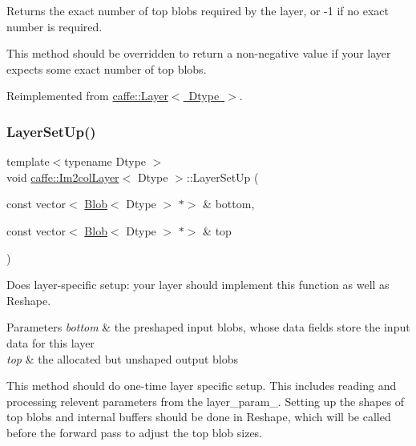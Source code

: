 Returns the exact number of top blobs required by the layer, or -\/1 if no exact number is required. 

This method should be overridden to return a non-\/negative value if your layer expects some exact number of top blobs. 

Reimplemented from \mbox{\hyperlink{classcaffe_1_1_layer_a64e2ca72c719e4b2f1f9216ccfb0d37f}{caffe\+::\+Layer$<$ Dtype $>$}}.

\mbox{\label{classcaffe_1_1_im2col_layer_ac4d6f34378681fa197546468b5aa6fd6}} 
\subsubsection{\texorpdfstring{Layer\+Set\+Up()}{LayerSetUp()}\hspace{0.1cm}{\footnotesize\ttfamily [1/2]}}
{\footnotesize\ttfamily template$<$typename Dtype $>$ \\
void \mbox{\hyperlink{classcaffe_1_1_im2col_layer}{caffe\+::\+Im2col\+Layer}}$<$ Dtype $>$\+::Layer\+Set\+Up (\begin{DoxyParamCaption}\item[{const vector$<$ \mbox{\hyperlink{classcaffe_1_1_blob}{Blob}}$<$ Dtype $>$ $\ast$$>$ \&}]{bottom,  }\item[{const vector$<$ \mbox{\hyperlink{classcaffe_1_1_blob}{Blob}}$<$ Dtype $>$ $\ast$$>$ \&}]{top }\end{DoxyParamCaption})\hspace{0.3cm}{\ttfamily [virtual]}}



Does layer-\/specific setup\+: your layer should implement this function as well as Reshape. 


\begin{DoxyParams}{Parameters}
{\em bottom} & the preshaped input blobs, whose data fields store the input data for this layer \\
\hline
{\em top} & the allocated but unshaped output blobs\\
\hline
\end{DoxyParams}
This method should do one-\/time layer specific setup. This includes reading and processing relevent parameters from the {\ttfamily layer\+\_\+param\+\_\+}. Setting up the shapes of top blobs and internal buffers should be done in {\ttfamily Reshape}, which will be called before the forward pass to adjust the top blob sizes. 

